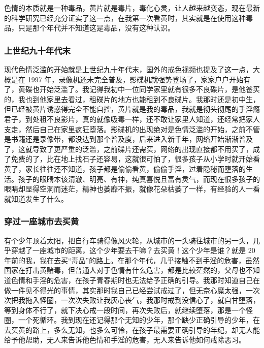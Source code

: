 色情的本质就是一种毒品，黄片就是毒片，毒化心灵，让人越来越变态，现在最新的科学研究已经充分证实了这一点，在我第一次看黄时，其实就是在使用这种毒品，只是那个年代并不知道这是毒品，没有这种认识。

\subsubsection{上世纪九十年代末}

现代色情泛滥的开始就是上世纪九十年代末，国外的戒色视频也提及了这一点，大概是在 1997 年，录像机还未完全普及，影碟机就强势登场了，家家户户开始有了，黄碟也开始泛滥了。我记得我初中一位同学家里就有很多不良碟片，是他爸买的，我也到他家里去看过，租碟片的地方也能租到不良碟片。我那时还是初中生，但已经被黄片诱惑得完全不能自控，黄片就是我的毒品，我就是彻头彻尾的手淫瘾君子，到处租不良影片，真的就像吸毒一样，还不敢让家里人知道，还经常把家人支走，然后自己在家里疯狂堕落。影碟机的出现绝对是色情泛滥的开始，之前不管是书籍还是录像带，都没达到那个普及度，后来进入新千年，网络开始渐渐普及了，这就导致了更严重的泛滥，之前碟片还需买，网络的出现直接都不用买了，成了免费的了，比在地上找石子还容易，这就很可怕了，很多孩子从小学时就开始看黄了，家长往往还不知道，孩子都是偷偷看黄，偷偷手淫，过着隐秘而堕落的生活。孩子的眼睛本该清澈、明亮、有神，纯真喜悦且富有灵气，而现在很多孩子的眼睛却显得空洞而迷茫，精神也萎靡不振，就像花朵枯萎了一样，有经验的人一看就知道发生了什么。

\subsubsection{穿过一座城市去买黄}

有个少年顶着太阳，把自行车骑得像风火轮，从城市的一头骑往城市的另一头，几乎穿越了一座城市的距离，这个少年要去干嘛？去买黄！这个少年是谁？就是 20 年前的我，我在去买“毒品”的路上。在那个年代，几乎接触不到手淫的危害，虽然国家在打击黄赌毒，但普通人对于色情有什么危害，都是比较茫然的，父母也不知道色情和手淫的危害，在孩子青春期时也无法给予正确的引导。我那时知道自己在做一件见不得光的事情，其实那时我自己已经尝试戒过了，但无奈心魔太强，一次次把我拖入怪圈，一次次失败让我灰心丧气，我那时戒到没信心了，就自甘堕落，等到身体不行了，就下决心戒一段时间，再次失败后，就继续堕落，那是一个怪圈，一个死循环。我到现在还记得那个无知的少年，那个缺少正确引导的少年，在去买黄的路上，多么无知，也多么可怜，在孩子最需要正确引导的年纪，却无人能给予他帮助，无人来告诉他色情和手淫的危害，无人来告诉他如何戒除恶习。

